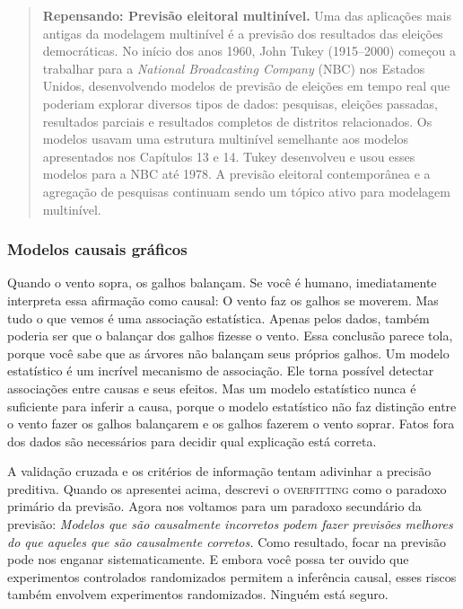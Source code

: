 \begin{quote}
  \textbf{Repensando: Previsão eleitoral multinível.} Uma das aplicações mais antigas da modelagem multinível é a previsão dos resultados das eleições democráticas. No início dos anos 1960, John Tukey (1915–2000) começou a trabalhar para a \textit{National Broadcasting Company} (NBC) nos Estados Unidos, desenvolvendo modelos de previsão de eleições em tempo real que poderiam explorar diversos tipos de dados: pesquisas, eleições passadas, resultados parciais e resultados completos de distritos relacionados. Os modelos usavam uma estrutura multinível semelhante aos modelos apresentados nos Capítulos 13 e 14. Tukey desenvolveu e usou esses modelos para a NBC até 1978. A previsão eleitoral contemporânea e a agregação de pesquisas continuam sendo um tópico ativo para modelagem multinível.
\end{quote}

\subsubsection{Modelos causais gráficos}

Quando o vento sopra, os galhos balançam. Se você é humano, imediatamente interpreta essa afirmação como causal: O vento faz os galhos se moverem. Mas tudo o que vemos é uma associação estatística. Apenas pelos dados, também poderia ser que o balançar dos galhos fizesse o vento. Essa conclusão parece tola, porque você sabe que as árvores não balançam seus próprios galhos. Um modelo estatístico é um incrível mecanismo de associação. Ele torna possível detectar associações entre causas e seus efeitos. Mas um modelo estatístico nunca é suficiente para inferir a causa, porque o modelo estatístico não faz distinção entre o vento fazer os galhos balançarem e os galhos fazerem o vento soprar. Fatos fora dos dados são necessários para decidir qual explicação está correta.

A validação cruzada e os critérios de informação tentam adivinhar a precisão preditiva. Quando os apresentei acima, descrevi o \textsc{overfitting} como o paradoxo primário da previsão. Agora nos voltamos para um paradoxo secundário da previsão: \textit{Modelos que são causalmente incorretos podem fazer previsões melhores do que aqueles que são causalmente corretos.} Como resultado, focar na previsão pode nos enganar sistematicamente. E embora você possa ter ouvido que experimentos controlados randomizados permitem a inferência causal, esses riscos também envolvem experimentos randomizados. Ninguém está seguro.

